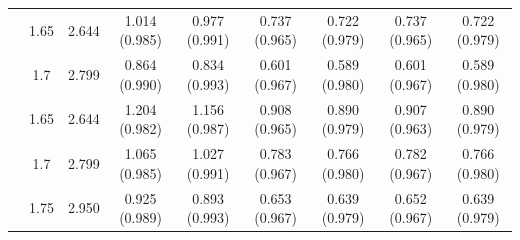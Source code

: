 \begin{tabular}{c c c c c c c c c}
 & 1.65 & 2.644 & 1.014 (0.985) & 0.977 (0.991) & 0.737 (0.965) & 0.722 (0.979) & 0.737 (0.965) & 0.722 (0.979) \\
 & 1.7 & 2.799 & 0.864 (0.990) & 0.834 (0.993) & 0.601 (0.967) & 0.589 (0.980) & 0.601 (0.967) & 0.589 (0.980) \\
\addlinespace
5 & 1.65 & 2.644 & 1.204 (0.982) & 1.156 (0.987) & 0.908 (0.965) & 0.890 (0.979) & 0.907 (0.963) & 0.890 (0.979) \\
 & 1.7 & 2.799 & 1.065 (0.985) & 1.027 (0.991) & 0.783 (0.967) & 0.766 (0.980) & 0.782 (0.967) & 0.766 (0.980) \\
 & 1.75 & 2.950 & 0.925 (0.989) & 0.893 (0.993) & 0.653 (0.967) & 0.639 (0.979) & 0.652 (0.967) & 0.639 (0.979) \\
\bottomrule
\end{tabular}
